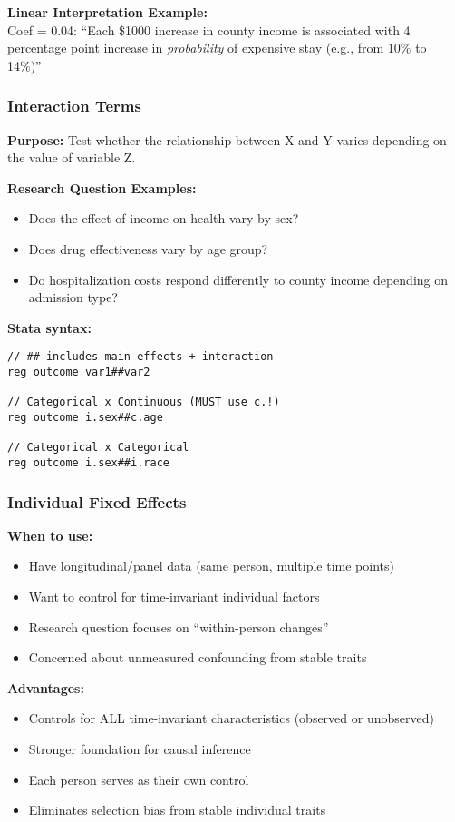 ﻿\documentclass[8pt,letterpaper]{article}
\begin{document}
\begin{multicols}{2}
\textbf{Linear Interpretation Example:}\\
Coef = 0.04: ``Each \$1000 increase in county income is associated with 4 percentage point increase in \textit{probability} of expensive stay (e.g., from 10\% to 14\%)''

\subsubsection{Interaction Terms}

\textbf{Purpose:} Test whether the relationship between X and Y varies depending on the value of variable Z.

\textbf{Research Question Examples:}
\begin{itemize}
\item Does the effect of income on health vary by sex?
\item Does drug effectiveness vary by age group?
\item Do hospitalization costs respond differently to county income depending on admission type?
\end{itemize}

\textbf{Stata syntax:}
\begin{lstlisting}
// ## includes main effects + interaction
reg outcome var1##var2

// Categorical x Continuous (MUST use c.!)
reg outcome i.sex##c.age

// Categorical x Categorical
reg outcome i.sex##i.race
\end{lstlisting}

\subsubsection{Individual Fixed Effects}

\textbf{When to use:}
\begin{itemize}
\item Have longitudinal/panel data (same person, multiple time points)
\item Want to control for time-invariant individual factors
\item Research question focuses on ``within-person changes''
\item Concerned about unmeasured confounding from stable traits
\end{itemize}

\textbf{Advantages:}
\begin{itemize}
\item Controls for ALL time-invariant characteristics (observed or unobserved)
\item Stronger foundation for causal inference
\item Each person serves as their own control
\item Eliminates selection bias from stable individual traits
\end{itemize}


\end{multicols}
\end{document}
